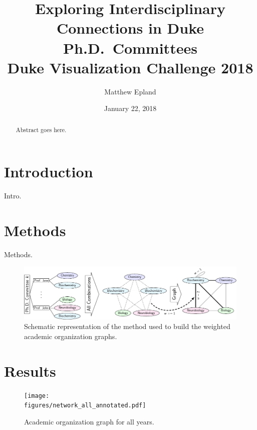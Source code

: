 \documentclass[notitlepage,aps,prd,nofootinbib]{revtex4-1}
\newcommand{\figures}{../outputs/plots}
\begin{document}
\title{Exploring Interdisciplinary Connections in Duke Ph.D.\ Committees\\Duke Visualization Challenge 2018}
\author{Matthew\,\,Epland}
\date{January 22, 2018}


\begin{abstract}
Abstract goes here.
\end{abstract}

\maketitle

\section{Introduction}
Intro.

\section{Methods}
Methods.

\begin{figure}[!htb]\centering
  \includegraphics[width=\textwidth]{../poster/tikzout/vis_challenge_2018_poster-matthew_epland-figure0.pdf}
  \caption{Schematic representation of the method used to build the weighted academic organization graphs.}
  \label{fig:method_schematic}
\end{figure}

\section{Results}

\begin{figure}[!htb]\centering
  \texttt{[image: \\figures/network\_all\_annotated.pdf]}
  \caption{Academic organization graph for all years.}
  \label{fig:graph_all_years}
\end{figure}
\end{document}
